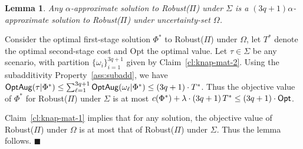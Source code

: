 \documentclass[11pt,letterpaper]{article}
\newtheorem{lemma}[theorem]{Lemma}
\newenvironment{proof}{

\noindent{\bf Proof:}} {\hfill$\blacksquare$


}
\def\opt{{\sf Opt}\xspace}
\def\cov{\ensuremath{\Pi}\xspace}
\def\rcov{{\sf Robust(\cov)}\xspace}
\newcommand{\optaug}{{\sf OptAug}}
\newcounter{note}[section]
\newcommand{\Tstar}{\ensuremath{T^*}\xspace}
\newcommand{\Phistar}{\ensuremath{\Phi^*}\xspace}
\begin{document}
\begin{lemma}\label{lem:knap-mat-combine}
Any $\alpha$-approximate solution to \rcov under $\Sigma$ is a $(3q+1)\alpha$-approximate solution to \rcov under
uncertainty-set $\Omega$.
\end{lemma}
\begin{proof}
Consider the optimal first-stage solution $\Phistar$ to \rcov under $\Omega$, let \Tstar denote the optimal
second-stage cost and \opt the optimal value. Let $\tau\in \Sigma$ be any scenario, with partition
$\{\omega_i\}_{i=1}^{3q+1}$ given by Claim~\ref{cl:knap-mat-2}. Using the subadditivity Property~\ref{ass:subadd}, we
have $\optaug(\tau|\Phistar)\le \sum_{\ell=1}^{3q+1} \optaug(\omega_\ell|\Phistar) \le (3q+1)\cdot \Tstar$. Thus the
objective value of $\Phistar$ for \rcov under $\Sigma$ is at most $c(\Phistar)+\lambda\cdot (3q+1)\, \Tstar \le
(3q+1)\cdot \opt$.

Claim~\ref{cl:knap-mat-1} implies that for any solution, the objective value of \rcov under $\Omega$ is at most that of
\rcov under $\Sigma$. Thus the lemma follows.
\end{proof}
\end{document}
